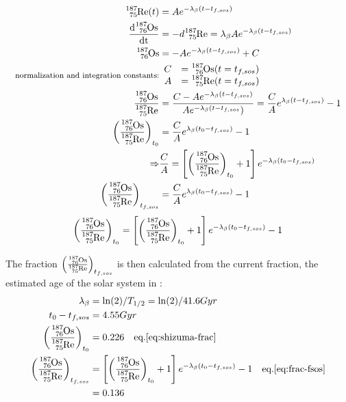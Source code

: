 \begin{align*}
  \re{187}(t) &= A e^{-\lambda_\beta (t-t_{f,sos})} \\
  \d{\os{187}} &= -d{\re{187}} = \lambda_\beta A e^{-\lambda_\beta (t-t_{f,sos})} \\
  \os{187} &= - A e^{-\lambda_\beta (t-t_{f,sos})} + C \\
  \textrm{\footnotesize normalization and integration constants:} & 
  \begin{array}{rl}
    C &= \os{187}(t=t_{f,sos}) \\
    A &= \re{187}(t=t_{f,sos})
  \end{array} \\
  \frac{\os{187}}{\re{187}} &= \frac{C - Ae^{-\lambda_\beta (t-t_{f,sos})}}{Ae^{-\lambda_\beta (t-t_{f,sos}})}
  = \frac{C}{A}e^{\lambda_\beta (t-t_{f,sos})} - 1 \\
  \left( \frac{\os{187}}{\re{187}} \right)_{t_0} &= \frac{C}{A}e^{\lambda_\beta (t_0-t_{f,sos})} - 1 \\
  \Rightarrow& \frac{C}{A} = \left[ \left( \frac{\os{187}}{\re{187}} \right)_{t_0} + 1\right]e^{-\lambda_\beta (t_0-t_{f,sos})} \\
  \left( \frac{\os{187}}{\re{187}} \right)_{t_{f,sos}} &= \frac{C}{A}e^{\lambda_\beta (t_0-t_{f,sos})} - 1
\end{align*}
\begin{equation}
  \label{eq:frac-fsos}
  \left( \frac{\os{187}}{\re{187}} \right)_{t_0} = \left[ \left( \frac{\os{187}}{\re{187}} \right)_{t_0} + 1\right]e^{-\lambda_\beta (t_0-t_{f,sos})} - 1
\end{equation}

The fraction $\left( \frac{\os{187}}{\re{187}} \right)_{t_{f,sos}}$ is then calculated from the current fraction, the estimated age of the solar system in :
\begin{align*}
  \lambda_\beta &= \ln(2)/T_{1/2} = \ln(2)/41.6Gyr \\
  t_0 - t_{f,sos} &= 4.55 Gyr \\
  \left( \frac{\os{187}}{\re{187}} \right)_{t_0} &= 0.226 \quad \textrm{eq.\ref{eq:shizuma-frac}} \\
  \left( \frac{\os{187}}{\re{187}} \right)_{t_{f,sos}} &= \left[ \left( \frac{\os{187}}{\re{187}} \right)_{t_0} + 1 \right]e^{-\lambda_\beta (t_0-t_{f,sos})} - 1 \quad \textrm{eq.\ref{eq:frac-fsos}} \\
  &= 0.136
\end{align*}

